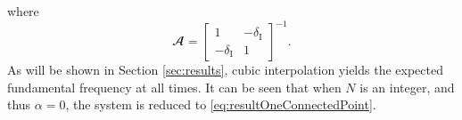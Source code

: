 \documentclass[dvipsnames, reprint]{JASA}
\begin{document}
where
\begin{equation}\label{eq:Amat}
    \mathbfcal{A} = \begin{bmatrix}
         1 & -\delta_\text{I} \\
         -\delta_\text{I} & 1
    \end{bmatrix}^{-1}.\nonumber
\end{equation}
As will be shown in Section \ref{sec:results}, cubic interpolation yields the expected fundamental frequency at all times. It can be seen that when $N$ is an integer, and thus $\alpha = 0$, the system is reduced to \eqref{eq:resultOneConnectedPoint}. %
\end{document}

